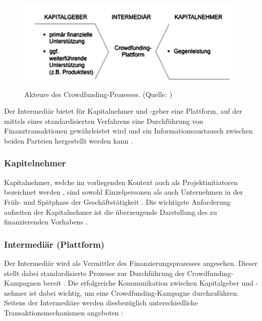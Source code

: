 \begin{figure}[htb]
	\centering
	\includegraphics[width=\textwidth]{images/crowdfunding_akteure}
	\caption{Akteure des Crowdfunding-Prozesses. (Quelle: \citeauthor{Guenther2019} \citeyear{Guenther2019})}
	\label{fig:crowdfunding_actors}
\end{figure} 

Der Intermediär bietet für Kapitalnehmer und -geber eine Plattform, auf der mittels eines standardisierten Verfahrens eine Durchführung von Finanztransaktionen gewährleistet wird und ein Informationsaustausch zwischen beiden Parteien hergestellt werden kann \cites[7\psq]{Guenther2019}{moritz2015}.

\subsubsection*{Kapitelnehmer}
Kapitalnehmer, welche im vorliegenden Kontext auch als Projektinitiatoren bezeichnet werden \cite[11]{Gierczak2016}, sind sowohl Einzelpersonen als auch Unternehmen in der Früh- und Spätphase der Geschäftstätigkeit \cites{Gierczak2016}{Schwienbacher2010}[8]{Guenther2019}. Die wichtigste Anforderung aufseiten der Kapitalnehmer ist die überzeugende Darstellung des zu finanzierenden Vorhabens \cites{Guenther2019}{bouncken}. 
\subsubsection*{Intermediär (Plattform)}
Der Intermediär wird als Vermittler des Finanzierungsprozesses angesehen. Dieser stellt dabei standardisierte Prozesse zur Durchführung der Crowdfunding-Kampagnen bereit \cite[9]{Guenther2019}. Die erfolgreiche Kommunikation zwischen Kapitalgeber und -nehmer ist dabei wichtig, um eine Crowdfunding-Kampagne durchzuführen. Seitens der Intermediäre werden diesbezüglich unterschiedliche Transaktionsmechanismen angeboten \cite[9]{Guenther2019}:

